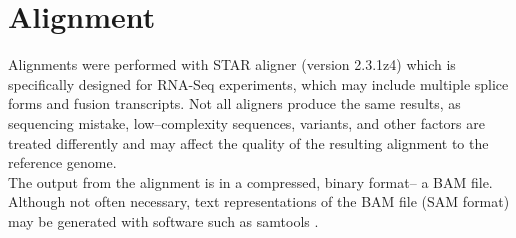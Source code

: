 \documentclass{article}
\begin{document}
{%

\section{Alignment}
Alignments were performed with STAR aligner  (version 2.3.1z4) \cite{star} which is specifically designed for RNA-Seq experiments, which may include multiple splice forms and fusion transcripts.  Not all aligners produce the same results, as sequencing mistake, low--complexity sequences, variants, and other factors are treated differently and may affect the quality of the resulting alignment to the reference genome.\\

The output from the alignment is in a compressed, binary format-- a BAM file.  Although not often necessary, text representations of the BAM file (SAM format) may be generated with software such as samtools \cite{samtools}.\\

}
\end{document}
